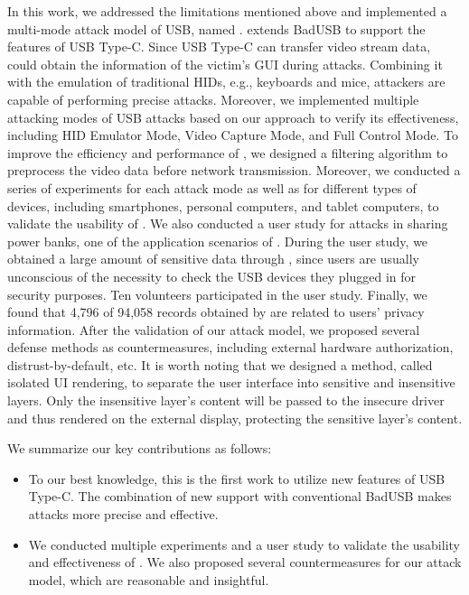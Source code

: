 In this work, we addressed the limitations mentioned
above and implemented a multi-mode attack model of \ac{USB}, named \tool.  \tool
extends BadUSB to support the features of \ac{USB} Type-C.  Since \ac{USB} Type-C can transfer video stream data, \tool could obtain the information of the
victim's \ac{GUI} during attacks.  Combining it with the emulation
of traditional \acp{HID}, e.g., keyboards and mice, attackers are capable of
performing precise attacks.  
Moreover, we implemented multiple attacking
modes of \ac{USB} attacks based on our approach to verify its effectiveness,
including \ac{HID} Emulator Mode, Video Capture Mode, and Full Control Mode.  To improve the
efficiency and performance of \tool, we designed a filtering algorithm to
preprocess the video data before network transmission.  Moreover, we conducted
a series of experiments for each attack mode as well as for different types of
devices, including smartphones, personal computers, and tablet computers, to
validate the usability of \tool.  We also conducted a user study for attacks in
sharing power banks, one of the application scenarios of \tool.  During the
user study, we obtained a large amount of sensitive data through \tool, since
users are usually unconscious of the necessity to check the \ac{USB} devices they
plugged in for security purposes.  
Ten volunteers participated in the user study.
Finally, we found that 4,796 of 94,058 records obtained by \tool are related to users' privacy information.
After the validation of our attack model, we
proposed several defense methods as countermeasures, including external
hardware authorization, distrust-by-default, etc.  It is worth noting that we
designed a method, called isolated \ac{UI} rendering, to separate the user interface
into sensitive and insensitive layers.  Only the insensitive layer's content will be passed to the insecure driver and thus rendered on the external display, protecting the sensitive layer's content.

We summarize our key contributions as follows:

\begin{itemize} 
    
    \item To our best knowledge, this is the first work to utilize new features
	of \ac{USB} Type-C.  The combination of new support with conventional BadUSB
	makes attacks more precise and effective.
	
	
    \item We conducted multiple experiments and a user study to validate the
	usability and effectiveness of \tool.  We also proposed several
	countermeasures for our attack model, which are reasonable and
	insightful. 
\end{itemize}

